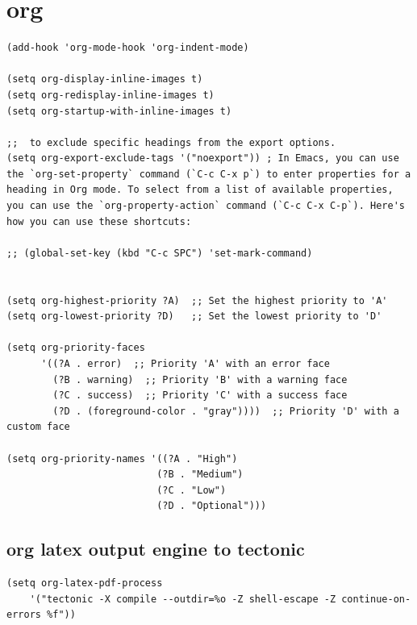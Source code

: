 \documentclass[11pt]{article}
\begin{document}
\section{org}
\label{sec:org2baffd8}
\begin{verbatim}
(add-hook 'org-mode-hook 'org-indent-mode)

(setq org-display-inline-images t)
(setq org-redisplay-inline-images t)
(setq org-startup-with-inline-images t)

;;  to exclude specific headings from the export options.
(setq org-export-exclude-tags '("noexport")) ; In Emacs, you can use the `org-set-property` command (`C-c C-x p`) to enter properties for a heading in Org mode. To select from a list of available properties, you can use the `org-property-action` command (`C-c C-x C-p`). Here's how you can use these shortcuts:

;; (global-set-key (kbd "C-c SPC") 'set-mark-command)


(setq org-highest-priority ?A)  ;; Set the highest priority to 'A'
(setq org-lowest-priority ?D)   ;; Set the lowest priority to 'D'

(setq org-priority-faces
      '((?A . error)  ;; Priority 'A' with an error face
        (?B . warning)  ;; Priority 'B' with a warning face
        (?C . success)  ;; Priority 'C' with a success face
        (?D . (foreground-color . "gray"))))  ;; Priority 'D' with a custom face

(setq org-priority-names '((?A . "High")
                          (?B . "Medium")
                          (?C . "Low")
                          (?D . "Optional")))
\end{verbatim}
\subsection{org latex output engine to tectonic}
\label{sec:org369ab6d}
\begin{verbatim}
(setq org-latex-pdf-process 
    '("tectonic -X compile --outdir=%o -Z shell-escape -Z continue-on-errors %f"))
\end{verbatim}
\end{document}
